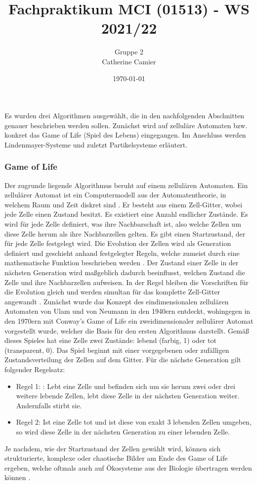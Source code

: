 \documentclass[../mciAusarbeitung.tex]{subfiles}
\title{Fachpraktikum MCI (01513) - WS 2021/22}
\author{Gruppe 2\\
	Catherine Camier}
\date{\today}
\begin{document}
Es wurden drei Algorithmen ausgewählt, die in den nachfolgenden Abschnitten genauer beschrieben werden sollen. Zunächst wird auf zelluläre Automaten bzw. konkret das Game of Life (Spiel des Lebens) eingegangen. Im Anschluss werden Lindenmayer-Systeme und zuletzt Partikelsysteme erläutert.

\subsubsection{Game of Life}
	
Der zugrunde liegende Algorithmus beruht auf einem zellulären Automaten. Ein zellulärer Automat ist ein Computermodell aus der Automatentheorie, in welchem Raum und Zeit diskret sind \cite{wolfram1983statistical}. Er besteht aus einem Zell-Gitter, wobei jede Zelle einen Zustand besitzt. Es existiert eine Anzahl endlicher Zustände. Es wird für jede Zelle definiert, was ihre Nachbarschaft ist, also welche Zellen um diese Zelle herum als ihre Nachbarzellen gelten. Es gibt einen Startzustand, der für jede Zelle festgelegt wird. Die Evolution der Zellen wird als Generation definiert und geschieht anhand festgelegter Regeln, welche zumeist durch eine mathematische Funktion beschrieben werden \cite{toffoli1987cellular}.
Der Zustand einer Zelle in der nächsten Generation wird maßgeblich dadurch beeinflusst, welchen Zustand die Zelle und ihre Nachbarzellen aufweisen. In der Regel bleiben die Vorschriften für die Evolution gleich und werden simultan für das komplette Zell-Gitter angewandt \cite{schiff2011cellular}.
Zunächst wurde das Konzept des eindimensionalen zellulären Automaten von Ulam und von Neumann in den 1940ern entdeckt, wohingegen in den 1970ern mit Conway's Game of Life ein zweidimensionaler zellulärer Automat vorgestellt wurde, welcher die Basis für den ersten Algorithmus darstellt. Gemäß dieses Spieles hat eine Zelle zwei Zustände: lebend (farbig, 1) oder tot (transparent, 0). Das Spiel beginnt mit einer vorgegebenen oder zufälligen Zustandsverteilung der Zellen auf dem Gitter. Für die nächste Generation gilt folgender Regelsatz:
\begin{itemize}
\item Regel 1: : Lebt eine Zelle und befinden sich um sie herum zwei oder drei weitere lebende Zellen, lebt diese Zelle in der nächsten Generation weiter. Andernfalls stirbt sie.
\item Regel 2: Ist eine Zelle tot und ist diese von exakt 3 lebenden Zellen umgeben, so wird diese Zelle in der nächsten Generation zu einer lebenden Zelle.
\end{itemize}
Je nachdem, wie der Startzustand der Zellen gewählt wird, können sich strukturierte, komplexe oder chaotische Bilder am Ende des Game of Life ergeben, welche oftmals auch auf Ökosysteme aus der Biologie übertragen werden können \cite{bays1987candidates}.
\end{document}
